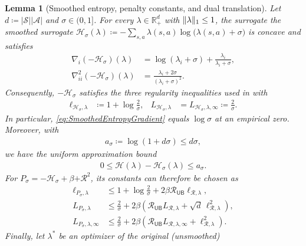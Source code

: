 \documentclass[10pt,a4paper]{amsart}
\def\AA{{\mathcal{A}}}
\def\HH{{\mathcal{H}}}
\def\RR{{\mathbb{R}}}
\def\Reg{{\mathcal{R}}}
\def\RegMax{{\mathcal{R}_{\mathsf{UB}}}}
\def\SS{{\mathcal{S}}}
\def\aa{{a}}
\providecommand{\card}[1]{\left|#1\right|}
\providecommand{\define}{\coloneqq}
\DeclarePairedDelimiter{\norm}{\lVert}{\rVert}
\providecommand{\pen}[1]{{\plus{#1}^2}}
\DeclarePairedDelimiter{\plus}{[}{]_{+}}
\def\ss{{s}}
\theoremstyle{plain}
\newtheorem{lemma}[theorem]{Lemma}
\theoremstyle{definition}
\theoremstyle{remark}
\begin{document}
\setcounter{section}{3}
\setcounter{theorem}{2}
\setcounter{equation}{6}
\begin{lemma}[Smoothed entropy, penalty constants, and dual translation]
 \label{lem:SmoothedEntropyProperties}
 Let $d\define\card{\SS}\card{\AA}$ and $\sigma\in(0,1]$.
 For every $\lambda\in\RR_+^d$ with $\norm{\lambda}_1\leq1$, the surrogate
 the smoothed surrogate $\HH_\sigma(\lambda)
  \define-\sum_{\ss,\aa}\lambda(\ss,\aa)
  \log\bigl(\lambda(\ss,\aa)+\sigma\bigr)$
 is concave and satisfies
 \begin{align}
  \nabla_i(-\HH_\sigma)(\lambda)
   & =\log(\lambda_i+\sigma)
  +\frac{\lambda_i}{\lambda_i+\sigma},
  \label{eq:SmoothedEntropyGradient}                  \\
  \nabla_{ii}^2(-\HH_\sigma)(\lambda)
   & =\frac{\lambda_i+2\sigma}{(\lambda_i+\sigma)^2}.
  \label{eq:SmoothedEntropyHessian}
 \end{align}
 Consequently, $-\HH_\sigma$ satisfies the three regularity
 inequalities used in  with
 \begin{align}
  \ell_{\HH_\sigma,\lambda}
   & \define 1+\log\frac{2}{\sigma},
   & L_{\HH_\sigma,\lambda}
   & =L_{\HH_\sigma,\lambda,\infty}\define\frac{2}{\sigma}.
  \label{eq:SmoothedEntropyConstants}
 \end{align}
 In particular, \eqref{eq:SmoothedEntropyGradient} equals
 $\log\sigma$ at an empirical zero. Moreover, with
 \begin{align}
  a_\sigma\define\log(1+d\sigma)\leq d\sigma,
 \end{align}
 we have the uniform approximation bound
 \begin{align*}
  0\leq\HH(\lambda)-\HH_\sigma(\lambda)\leq a_\sigma.
 \end{align*}
 For $P_\sigma=-\HH_\sigma+\beta\pen{\Reg}$, its constants can
 therefore be chosen as
 \begin{align}
  \ell_{P_\sigma,\lambda}
   & \leq1+\log\frac{2}{\sigma}
  +2\beta\RegMax\ell_{\Reg,\lambda},
  \label{eq:SmoothedPenaltyGradientConstant} \\
  L_{P_\sigma,\lambda}
   & \leq\frac{2}{\sigma}
  +2\beta\left(\RegMax L_{\Reg,\lambda}
  +\sqrt d\,\ell_{\Reg,\lambda}^2\right),
  \label{eq:SmoothedPenaltyL2Constant}       \\
  L_{P_\sigma,\lambda,\infty}
   & \leq\frac{2}{\sigma}
  +2\beta\left(\RegMax L_{\Reg,\lambda,\infty}
  +\ell_{\Reg,\lambda}^2\right).
  \label{eq:SmoothedPenaltyL1Constant}
 \end{align}
 Finally, let $\lambda^*$ be an optimizer of the original (unsmoothed)

\end{lemma}
\end{document}
